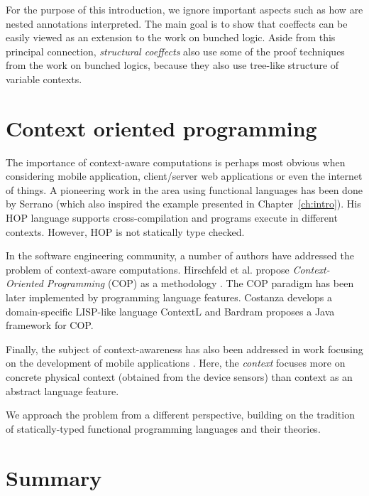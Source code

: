 For the purpose of this introduction, we ignore important aspects such as how are nested annotations
interpreted. The main goal is to show that coeffects can be easily viewed as an extension to the 
work on bunched logic. Aside from this principal connection, \emph{structural coeffects} also 
use some of the proof techniques from the work on bunched logics, because they also use tree-like
structure of variable contexts.



\section{Context oriented programming}

The importance of context-aware computations is perhaps most obvious when considering mobile
application, client/server web applications or even the internet of things. A pioneering work
in the area using functional languages has been done by Serrano \cite{app-hop-diffuse,app-hop-lang}
(which also inspired the example presented in Chapter~\ref{ch:intro}). His HOP language supports 
cross-compilation and programs execute in different contexts. However, HOP is not statically 
type checked.

In the software engineering community, a number of authors have addressed the
problem of context-aware computations. Hirschfeld et al. propose \emph{Context-Oriented Programming} 
(COP) as a methodology \cite{app-cop-method}. The COP paradigm has been later implemented by
programming language features. Costanza \cite{app-cop-contextl} develops a domain-specific LISP-like 
language ContextL and Bardram \cite{app-cop-javafwk} proposes a Java framework for COP.

Finally, the subject of context-awareness has also been addressed in work focusing on the development 
of mobile applications \cite{app-cop-mobile,app-cop-mobile2}. Here, the \emph{context} focuses more 
on concrete physical context (obtained from the device sensors) than context as an abstract 
language feature.

We approach the problem from a different perspective, building on the tradition of 
statically-typed functional programming languages and their theories. 


\section{Summary}

